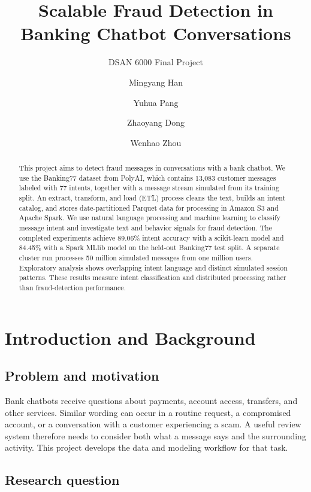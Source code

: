 \documentclass[
  english,
  11pt,
  letterpaper,
]{article}
\title{Scalable Fraud Detection in Banking Chatbot Conversations}
\subtitle{DSAN 6000 Final Project}
\author{Mingyang Han \and Yuhua Pang \and Zhaoyang Dong \and Wenhao
Zhou}
\date{}
\renewcommand*\contentsname{Table of contents}
\newcommand\contentsname{Table of contents}
\begin{document}
\maketitle
\begin{abstract}
This project aims to detect fraud messages in conversations with a bank
chatbot. We use the Banking77 dataset from PolyAI, which contains 13,083
customer messages labeled with 77 intents, together with a message
stream simulated from its training split. An extract, transform, and
load (ETL) process cleans the text, builds an intent catalog, and stores
date-partitioned Parquet data for processing in Amazon S3 and Apache
Spark. We use natural language processing and machine learning to
classify message intent and investigate text and behavior signals for
fraud detection. The completed experiments achieve 89.06\% intent
accuracy with a scikit-learn model and 84.45\% with a Spark MLlib model
on the held-out Banking77 test split. A separate cluster run processes
50 million simulated messages from one million users. Exploratory
analysis shows overlapping intent language and distinct simulated
session patterns. These results measure intent classification and
distributed processing rather than fraud-detection performance.
\end{abstract}

\renewcommand*\contentsname{Table of contents}
{
\setcounter{tocdepth}{3}
\tableofcontents
}

\section{Introduction and Background}\label{sec-introduction}

\subsection{Problem and motivation}\label{problem-and-motivation}

Bank chatbots receive questions about payments, account access,
transfers, and other services. Similar wording can occur in a routine
request, a compromised account, or a conversation with a customer
experiencing a scam. A useful review system therefore needs to consider
both what a message says and the surrounding activity. This project
develops the data and modeling workflow for that task.

\subsection{Research question}\label{research-question}
\end{document}
